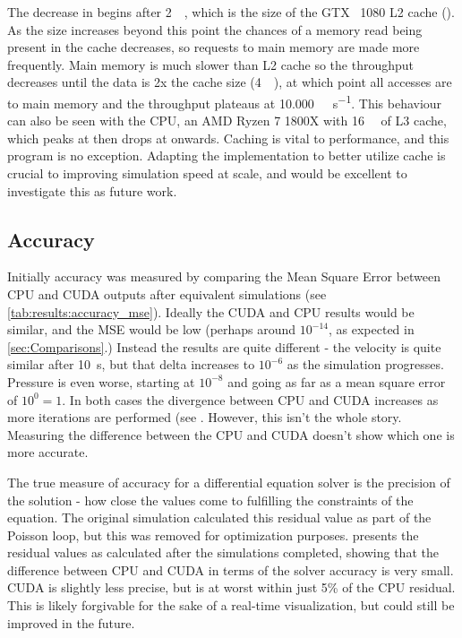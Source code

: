 The decrease in  begins after \SI{2}{\mega\byte}, which is the size of the GTX ~1080 L2 cache ().
As the size increases beyond this point the chances of a memory read being present in the cache decreases, so requests to main memory are made more frequently.
Main memory is much slower than L2 cache so the throughput decreases until the data is 2x the cache size (\SI{4}{\mega\byte}), at which point all accesses are to main memory and the throughput plateaus at \SI{10,000}{\mega\op\per\second}.
This behaviour can also be seen with the CPU, an AMD Ryzen 7 1800X with \SI{16}{\mega\byte} of L3 cache, which peaks at  then drops at  onwards.
Caching is vital to performance, and this program is no exception.
Adapting the implementation to better utilize cache is crucial to improving simulation speed at scale, and would be excellent to investigate this as future work.

\subsection{Accuracy}\label{sec:Results:Sim:Accuracy}


Initially accuracy was measured by comparing the Mean Square Error between CPU and CUDA outputs after equivalent simulations (see \cref{tab:results:accuracy_mse}).
Ideally the CUDA and CPU results would be similar, and the MSE would be low (perhaps around $10^{-14}$, as expected in \cref{sec:Comparisons}.)
Instead the results are quite different - the velocity is quite similar after \SI{10}{\second}, but that delta increases to $10^{-6}$ as the simulation progresses.
Pressure is even worse, starting at $10^{-8}$ and going as far as a mean square error of $10^{0} = 1$.
In both cases the divergence between CPU and CUDA increases as more iterations are performed (see .
However, this isn't the whole story.
Measuring the difference between the CPU and CUDA doesn't show which one is more accurate.

The true measure of accuracy for a differential equation solver is the precision of the solution - how close the values come to fulfilling the constraints of the equation.
The original simulation calculated this residual value as part of the Poisson loop, but this was removed for optimization purposes.
 presents the residual values as calculated after the simulations completed, showing that the difference between CPU and CUDA in terms of the solver accuracy is very small.
CUDA is slightly less precise, but is at worst within just 5\% of the CPU residual.
This is likely forgivable for the sake of a real-time visualization, but could still be improved in the future.


